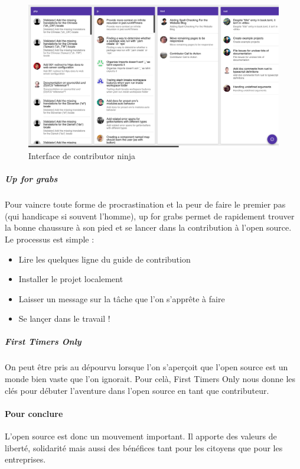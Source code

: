 				\begin{figure}[ht]
					\center
					\includegraphics[scale=0.30]{./img/ninja_os}
					\caption{Interface de contributor ninja}					
				\end{figure}

				\subparagraph{Up for grabs}

				Pour vaincre toute forme de procrastination et la peur de faire le premier pas (qui handicape si souvent l'homme), up for grabs permet de rapidement trouver la bonne chaussure à son pied et se lancer dans la contribution à l'open source. Le processus est simple :

				\begin{itemize}[label=\textbullet, font=\LARGE \color{burntorange}]
					\item Lire les quelques ligne du guide de contribution
					\item Installer le projet localement
					\item Laisser un message sur la tâche que l'on s'apprête à faire
					\item Se lançer dans le travail !
				\end{itemize}

				\subparagraph{First Timers Only}

				On peut être pris au dépourvu lorsque l'on s'aperçoit que l'open source est un monde bien vaste que l'on ignorait. Pour celà, First Timers Only nous donne les clés pour débuter l'aventure dans l'open source en tant que contributeur.
		
		\paragraph{Pour conclure\\}

			L’open source est donc un mouvement important. Il apporte des valeurs de liberté, solidarité mais aussi des bénéfices tant pour les citoyens que pour les entreprises. 
		
